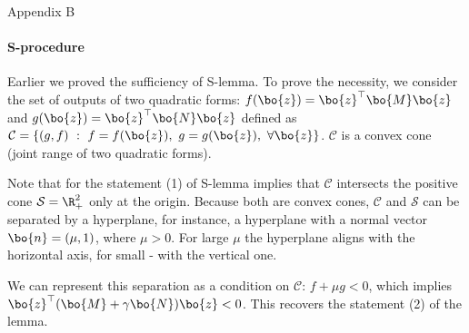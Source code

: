 \documentclass{beamer}
\begin{document}
\begin{frame}{Appendix B}
	\framesubtitle{S-procedure}
	\begin{flushleft}
		
		{\small 
		Earlier we proved the sufficiency of S-lemma. To prove the necessity, we consider the set of outputs of two quadratic forms: $f(\bo{z}) = \bo{z}^\top \bo{M}\bo{z}$ and $g(\bo{z}) = \bo{z}^\top \bo{N}\bo{z}$ defined as $\mathcal{C} = \{(g, f) \ : \ f = f(\bo{z}), \ g = g(\bo{z}), \ \forall \bo{z}\}$. $\mathcal{C}$ is a convex cone (joint range of two quadratic forms). 
		
		\bigskip
		
		Note that for the statement (1) of S-lemma implies that $\mathcal{C}$ intersects the positive cone $\mathcal{S} = \R^2_+$ only at the origin. Because both are convex cones, $\mathcal{C}$ and $\mathcal{S}$ can be separated by a hyperplane, for instance, a hyperplane with a normal vector $\bo{n} = (\mu, 1)$, where $\mu > 0$. For large $\mu$ the hyperplane aligns with the horizontal axis, for small - with the vertical one.
		
		\bigskip
		
		We can represent this separation as a condition on $\mathcal{C}$: $f + \mu g < 0$, which implies $\bo{z}^\top (\bo{M} + \gamma \bo{N})\bo{z} < 0$. This recovers the statement (2) of the lemma.
	}
		
	\end{flushleft}
\end{frame}
\end{document}
